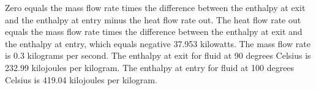 Zero equals the mass flow rate times the difference between the enthalpy at exit and the enthalpy at entry minus the heat flow rate out. The heat flow rate out equals the mass flow rate times the difference between the enthalpy at exit and the enthalpy at entry, which equals negative 37.953 kilowatts. The mass flow rate is 0.3 kilograms per second. The enthalpy at exit for fluid at 90 degrees Celsius is 232.99 kilojoules per kilogram. The enthalpy at entry for fluid at 100 degrees Celsius is 419.04 kilojoules per kilogram.